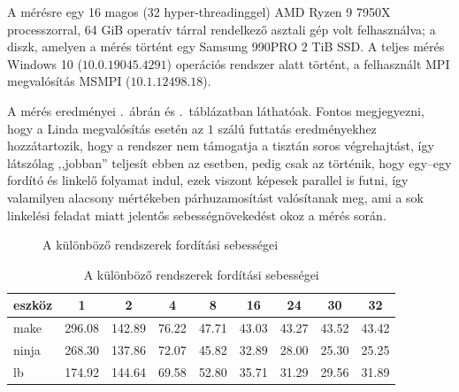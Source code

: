 A mérésre egy 16 magos (32 hyper-threadinggel) AMD Ryzen 9 7950X processzorral, 64 GiB operatív tárral rendelkező asztali gép volt felhasználva; a diszk, amelyen a mérés történt egy Samsung 990PRO 2 TiB SSD.
A teljes mérés Windows 10 ($10.0.19045.4291$) operációs rendszer alatt történt, a felhasznált MPI megvalósítás MSMPI ($10.1.12498.18$).

A mérés eredményei .~ábrán és .~táblázatban\label{hf:tbl-ref} láthatóak.
Fontos megjegyezni, hogy a Linda megvalósítás esetén az $1$ szálú futtatás eredményekhez hozzátartozik, hogy a rendszer nem támogatja a tisztán soros végrehajtást, így látszólag ,,jobban'' teljesít ebben az esetben, pedig csak az történik, hogy egy--egy fordító és linkelő folyamat indul, ezek viszont képesek parallel is futni, így valamilyen alacsony mértékeben párhuzamosítást valósítanak meg, ami a sok linkelési feladat miatt jelentős sebességnövekedést okoz a mérés során.

\begin{figure}[htb]
	\caption{A különböző rendszerek fordítási sebességei}
	\label{fig:bs-speed}
\end{figure}
	
\begin{table}[htb]
	\begin{tabularx}{\linewidth}{|X||c|c|c|c|c|c|c|c|}
		\hline
		eszköz & 1 & 2 & 4 & 8 & 16 & 24 & 30 & 32 \\
		\hline
		\hline
		make & 296.08 & 142.89 & 76.22 & 47.71 & 43.03 & 43.27 & 43.52 & 43.42 \\
		\hline
		
		ninja & 268.30 & 137.86 & 72.07 & 45.82 & 32.89 & 28.00 & 25.30 & 25.25 \\
		\hline
		
		lb & 174.92 & 144.64 & 69.58 & 52.80 & 35.71 & 31.29 & 29.56 & 31.89 \\
		\hline
	\end{tabularx}
	\caption{A különböző rendszerek fordítási sebességei}
	\label{tbl:bs-speed}
\end{table}



